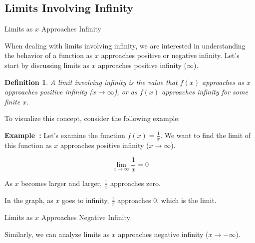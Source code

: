 \documentclass[a4paper,12pt]{book}
\newcounter{example}
\newenvironment{example}[1][\theexample]
  {\refstepcounter{example}\par\medskip\noindent\textbf{Example~#1:} \rmfamily}
  {\medskip}
\newtheorem{definition}{Definition}
\begin{document}
\subsection{Limits Involving Infinity}

Limits as \( x \) Approaches Infinity

When dealing with limits involving infinity, we are interested in understanding the behavior of a function as \( x \) approaches positive or negative infinity. Let's start by discussing limits as \( x \) approaches positive infinity (\( \infty \)).

\begin{definition}
A limit involving infinity is the value that \( f(x) \) approaches as \( x \) approaches positive infinity (\( x \to \infty \)), or as \( f(x) \) approaches infinity for some finite \( x \).
\end{definition}

To visualize this concept, consider the following example:

\begin{example}
Let's examine the function \( f(x) = \frac{1}{x} \). We want to find the limit of this function as \( x \) approaches positive infinity (\( x \to \infty \)).

\[
\lim_{{x \to \infty}} \frac{1}{x} = 0
\]

As \( x \) becomes larger and larger, \( \frac{1}{x} \) approaches zero.

\begin{center}
\end{center}

In the graph, as \( x \) goes to infinity, \( \frac{1}{x} \) approaches \( 0 \), which is the limit.
\end{example}

Limits as \( x \) Approaches Negative Infinity

Similarly, we can analyze limits as \( x \) approaches negative infinity (\( x \to -\infty \)).
\end{document}
